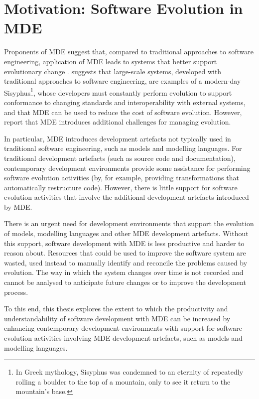 
\section{Motivation: Software Evolution in MDE}
Proponents of MDE suggest that, compared to traditional approaches to software engineering, application of MDE leads to systems that better support evolutionary change \cite{kleppe03mda}. \cite{frankel02mda} suggests that large-scale systems, developed with traditional approaches to software engineering, are examples of a  modern-day Sisyphus\footnote{In Greek mythology, Sisyphus was condemned to an eternity of repeatedly rolling a boulder to the top of a mountain, only to see it return to the mountain's base.}, whose developers must constantly perform evolution to support conformance to changing standards and interoperability with external systems, and that MDE can be used to reduce the cost of software evolution. However, \cite{Mens07} report that MDE introduces additional challenges for managing evolution.

In particular, MDE introduces development artefacts not typically used in traditional software engineering, such as models and modelling languages. For traditional development artefacts (such as source code and documentation), contemporary development environments provide some assistance for performing software evolution activities (by, for example, providing transformations that automatically restructure code). However, there is little support for software evolution activities that involve the additional development artefacts introduced by MDE.

There is an urgent need for development environments that support the evolution of models, modelling languages and other MDE development artefacts. Without this support, software development with MDE is less productive and harder to reason about. Resources that could be used to improve the software system are wasted, used instead to manually identify and reconcile the problems caused by evolution. The way in which the system changes over time is not recorded and cannot be analysed to anticipate future changes or to improve the development process.

To this end, this thesis explores the extent to which the productivity and understandability of software development with MDE can be increased by enhancing contemporary development environments with support for software evolution activities involving MDE development artefacts, such as models and modelling languages.
